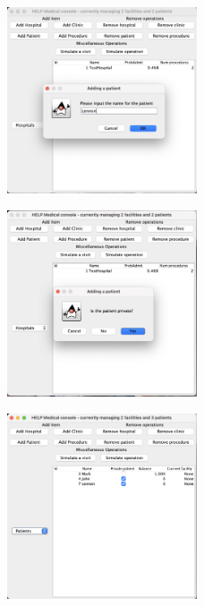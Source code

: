 \documentclass{article}
\begin{document}
\begin{figure}
  \begin{center}
    \includegraphics[width=0.5\textwidth]{./figures/Add/Patient_1.png}
  \end{center}
\end{figure}

\begin{figure}
  \begin{center}
    \includegraphics[width=0.5\textwidth]{./figures/Add/Patient_2.png}
  \end{center}
\end{figure}

\begin{figure}
  \begin{center}
    \includegraphics[width=0.5\textwidth]{./figures/Add/Patient_3.png}
  \end{center}
\end{figure}
\end{document}
